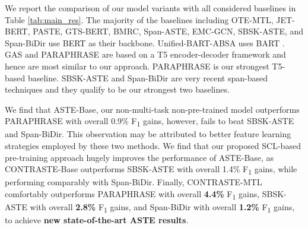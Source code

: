 We report the comparison of our model variants with all considered baselines in Table \ref{tab:main_res}.
The majority of the baselines including OTE-MTL, JET-BERT, PASTE, GTS-BERT, BMRC, Span-ASTE, EMC-GCN, SBSK-ASTE, and Span-BiDir use BERT \cite{devlin-etal-2019-bert} as their backbone. 
Unified-BART-ABSA uses BART \cite{lewis-etal-2020-bart}.
GAS and PARAPHRASE are based on a T5 encoder-decoder framework and hence are most similar to our approach. 
PARAPHRASE is our strongest T5-based baseline.
SBSK-ASTE and Span-BiDir are very recent span-based techniques and they qualify to be our strongest two baselines.

We find that ASTE-Base, our non-multi-task non-pre-trained model outperforms PARAPHRASE with overall 0.9\% F\textsubscript{1} gains, however, fails to beat SBSK-ASTE and Span-BiDir.
This observation may be attributed to better feature learning strategies employed by these two methods.
We find that our proposed SCL-based pre-training approach hugely improves the performance of ASTE-Base, as CONTRASTE-Base outperforms SBSK-ASTE with overall 1.4\% F\textsubscript{1} gains, while performing comparably with Span-BiDir.
Finally, CONTRASTE-MTL comfortably outperforms PARAPHRASE with overall \textbf{4.4\%} F\textsubscript{1} gains, SBSK-ASTE with overall \textbf{2.8\%} F\textsubscript{1} gains, and Span-BiDir with overall \textbf{1.2\%} F\textsubscript{1} gains, to achieve \textbf{new state-of-the-art ASTE results}.

